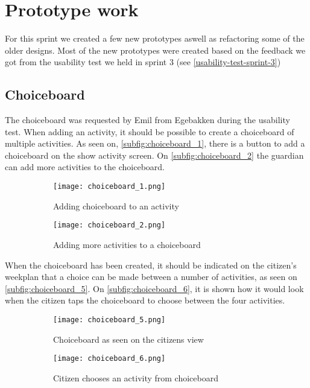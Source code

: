  \section{Prototype work}
For this sprint we created a few new prototypes aswell as refactoring some of the older designs. 
Most of the new prototypes were created based on the feedback we got from the usability test we held in sprint 3 (see \autoref{usability-test-sprint-3})

\subsection{Choiceboard}
The choiceboard was requested by Emil from Egebakken during the usability test. 
When adding an activity, it should be possible to create a choiceboard of multiple activities. 
As seen on, \autoref{subfig:choiceboard_1}, there is a button to add a choiceboard on the show activity screen. 
On \autoref{subfig:choiceboard_2} the guardian can add more activities to the choiceboard.
\begin{figure}[H]
    \begin{subfigure}{0.5\textwidth}
    \texttt{[image: choiceboard\_1.png]}
    \caption{Adding choiceboard to an activity}
    \label{subfig:choiceboard_1}
    \end{subfigure}
    \begin{subfigure}{0.5\textwidth}
    \texttt{[image: choiceboard\_2.png]}
    \caption{Adding more activities to a choiceboard}
    \label{subfig:choiceboard_2}
    \end{subfigure} 
    \caption{}
    \label{fig:choiceboard_1}
\end{figure}
\noindent
When the choiceboard has been created, it should be indicated on the citizen's weekplan that a choice can be made between a number of activities, as seen on \autoref{subfig:choiceboard_5}.
On \autoref{subfig:choiceboard_6}, it is shown how it would look when the citizen taps the choiceboard to choose between the four activities.
\begin{figure}[H]
    \begin{subfigure}{0.5\textwidth}
    \texttt{[image: choiceboard\_5.png]}
    \caption{Choiceboard as seen on the citizens view}
    \label{subfig:choiceboard_5}
    \end{subfigure}
    \begin{subfigure}{0.5\textwidth}
        \texttt{[image: choiceboard\_6.png]}
    \caption{Citizen chooses an activity from choiceboard}
    \label{subfig:choiceboard_6}
    \end{subfigure} 
    \caption{}
    \label{fig:choiceboard_2}
\end{figure}

